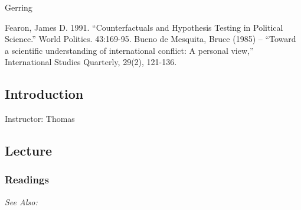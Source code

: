\documentclass[12pt,a4paper]{article}
\newcommand{\thomas}{\vspace{1em}\noindent Instructor: Thomas\\}
\newcommand{\seealso}{\noindent \emph{See Also:}}
\begin{document}
Gerring

Fearon, James D. 1991. “Counterfactuals and Hypothesis Testing in Political Science.” World Politics. 43:169-95.
Bueno de Mesquita, Bruce (1985) – “Toward a scientific understanding of international conflict: A personal view,” International Studies Quarterly, 29(2), 121-136.







\subsection{Introduction}
\emph{}

\thomas

\subsection*{Lecture}

\begin{itemize*}
\item 
\end{itemize*}

\subsubsection*{Readings}

\seealso





\end{document}
